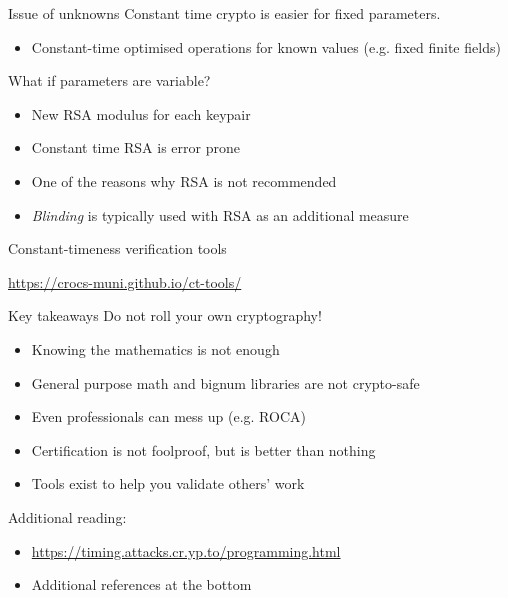 \begin{frame}{Issue of unknowns}
  Constant time crypto is easier for fixed parameters.
  \begin{itemize}[<+(1)->]
    \item Constant-time optimised operations for known values (e.g. fixed finite fields)
  \end{itemize}

  \vspace*{1em}

  \pause
  What if parameters are variable?
  \begin{itemize}[<+(1)->]
    \item New RSA modulus for each keypair
    \item Constant time RSA is error prone
    \item One of the reasons why RSA is not recommended
    \item \emph{Blinding} is typically used with RSA as an additional measure
  \end{itemize}
\end{frame}

\begin{frame}{Constant-timeness verification tools}
  \begin{center}
    \url{https://crocs-muni.github.io/ct-tools/}
  \end{center}
\end{frame}

\begin{frame}{Key takeaways}
  Do not roll your own cryptography!
  \begin{itemize}[<+(1)->]
    \item Knowing the mathematics is not enough
    \item General purpose math and bignum libraries are not crypto-safe
    \item Even professionals can mess up (e.g. ROCA)
    \item Certification is not foolproof, but is better than nothing
    \item Tools exist to help you validate others' work
  \end{itemize}

  \vspace*{1em}

  \pause
  Additional reading:
  \begin{itemize}
    \item \url{https://timing.attacks.cr.yp.to/programming.html}
    \item Additional references at the bottom
  \end{itemize}
\end{frame}


